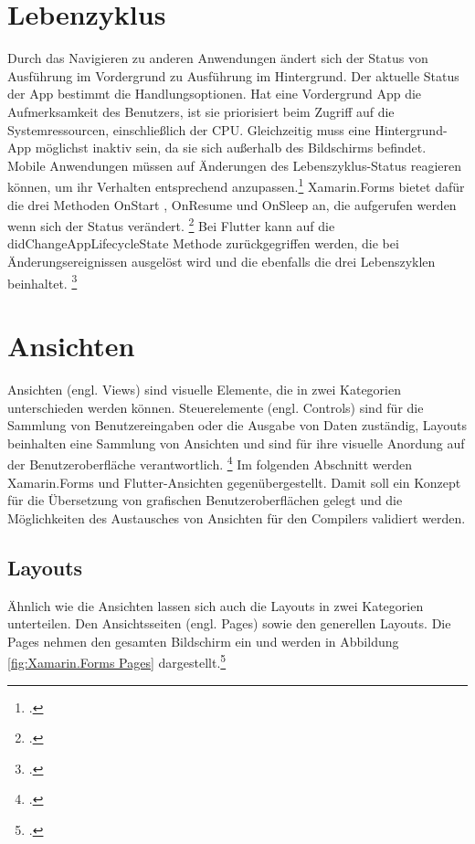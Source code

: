 \section{Lebenzyklus}
Durch das Navigieren zu anderen Anwendungen ändert sich der Status von Ausführung im Vordergrund zu Ausführung im Hintergrund.  Der aktuelle Status der App bestimmt die Handlungsoptionen.  Hat eine Vordergrund App die Aufmerksamkeit des Benutzers, ist sie priorisiert beim Zugriff auf die Systemressourcen, einschließlich der CPU.  Gleichzeitig muss eine Hintergrund-App möglichst inaktiv sein,  da sie sich außerhalb des Bildschirms befindet.  Mobile Anwendungen müssen auf Änderungen des Lebenszyklus-Status reagieren können, um ihr Verhalten entsprechend anzupassen.\footcite[Vgl.][Abgerufen am \today]{AppleLifecycycle2020} Xamarin.Forms bietet dafür die  drei Methoden \glq OnStart\grq{} , \glq OnResume\grq{} und \glq OnSleep\grq{} an,  die aufgerufen werden wenn sich der Status verändert. \footcite[Vgl.][Abgerufen am \today]{MicrosoftXamLifecycle2020} Bei Flutter kann auf die \glq didChangeAppLifecycleState\grq{} Methode zurückgegriffen werden, die bei Änderungsereignissen ausgelöst wird und die ebenfalls die drei Lebenszyklen beinhaltet. \footcite[Vgl.][Abgerufen am \today]{GoogleFlutterLifeCycle2020} 

\section{Ansichten}
Ansichten (engl. Views) sind visuelle Elemente, die in zwei Kategorien unterschieden werden können.  Steuerelemente (engl. Controls) sind für die Sammlung von Benutzereingaben oder die Ausgabe von Daten zuständig,  Layouts beinhalten eine Sammlung von Ansichten und sind für ihre visuelle Anordung auf der Benutzeroberfläche verantwortlich.  \footcite[Vgl.][Abgerufen am \today]{Ritscher2020} Im folgenden Abschnitt werden Xamarin.Forms und Flutter-Ansichten gegenübergestellt.  Damit soll ein Konzept für die Übersetzung von grafischen Benutzeroberflächen gelegt  und die Möglichkeiten des Austausches von Ansichten für den Compilers validiert werden.

\subsection{Layouts}
Ähnlich wie die Ansichten lassen sich auch die Layouts in zwei Kategorien unterteilen.  Den Ansichtsseiten (engl. Pages) sowie den generellen Layouts.  Die Pages nehmen den gesamten Bildschirm ein und werden in Abbildung \ref{fig:Xamarin.Forms Pages} dargestellt.\footcite[Vgl.][Abgerufen am \today]{MicrosoftXamPages2016}  

